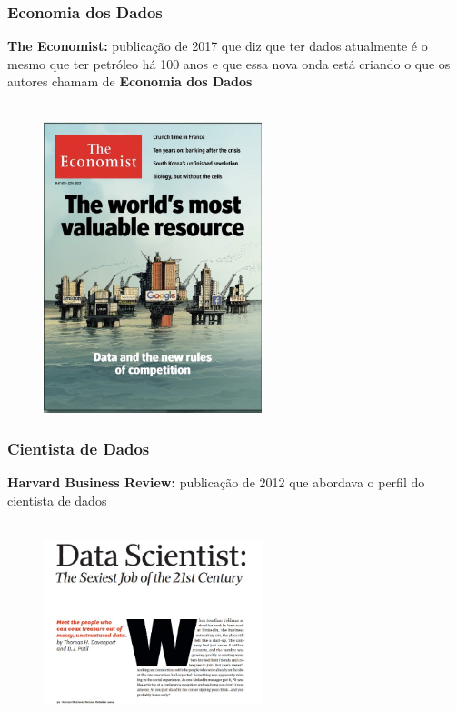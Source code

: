 \documentclass[10pt,xcolor=table]{beamer}
\begin{document}
\begin{frame}\frametitle{Economia dos Dados}
\textbf{The Economist:} publicação de 2017 que diz que ter dados atualmente é o mesmo que ter petróleo há 100 anos e que essa nova onda está criando o que os autores chamam de \textbf{Economia dos Dados} \\~\\
  \begin{figure}[hb]
    \includegraphics[width=2.5in]{Figure/theeconomist.jpg}
  \end{figure}
\end{frame}


\begin{frame}\frametitle{Cientista de Dados}
\textbf{Harvard Business Review:} publicação de 2012 que abordava o perfil do cientista de dados \\~\\
  \begin{figure}[hb]
    \includegraphics[width=2.5in]{Figure/data-scientist-hbr.jpg}
  \end{figure}
\end{frame}
\end{document}
